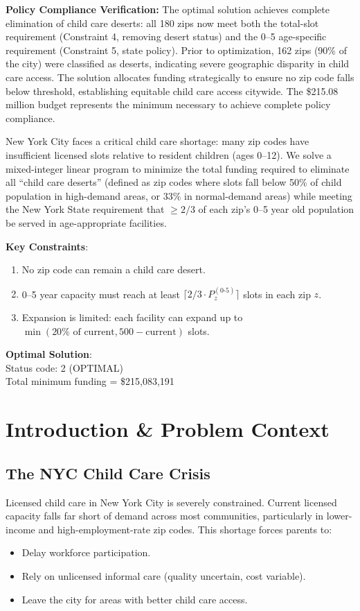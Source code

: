 \documentclass[12pt]{article}
\begin{document}
\noindent\textbf{Policy Compliance Verification:} The optimal solution achieves complete elimination of child care deserts: all 180 zips now meet both the total-slot requirement (Constraint 4, removing desert status) and the 0--5 age-specific requirement (Constraint 5, state policy). Prior to optimization, 162 zips (90\% of the city) were classified as deserts, indicating severe geographic disparity in child care access. The solution allocates funding strategically to ensure no zip code falls below threshold, establishing equitable child care access citywide. The \$215.08 million budget represents the minimum necessary to achieve complete policy compliance.

New York City faces a critical child care shortage: many zip codes have insufficient licensed slots relative to 
resident children (ages 0--12). We solve a mixed-integer linear program to minimize the total funding required to 
eliminate all ``child care deserts'' (defined as zip codes where slots fall below 50\% of child population in 
high-demand areas, or 33\% in normal-demand areas) while meeting the New York State requirement that $\geq 2/3$ 
of each zip's 0--5 year old population be served in age-appropriate facilities.

\textbf{Key Constraints}:
\begin{enumerate}
    \item No zip code can remain a child care desert.
    \item 0--5 year capacity must reach at least $\lceil 2/3 \cdot P_z^{(0\text{-}5)} \rceil$ slots in each zip $z$.
    \item Expansion is limited: each facility can expand up to $\min(20\% \text{ of current}, 500 - \text{current})$ slots.
\end{enumerate}

\textbf{Optimal Solution}: \\
Status code: 2 (OPTIMAL) \\
Total minimum funding = \$215,083,191

\section{Introduction \& Problem Context}

\subsection{The NYC Child Care Crisis}

Licensed child care in New York City is severely constrained. Current licensed capacity falls far short of 
demand across most communities, particularly in lower-income and high-employment-rate zip codes. This shortage 
forces parents to:
\begin{itemize}
    \item Delay workforce participation.
    \item Rely on unlicensed informal care (quality uncertain, cost variable).
    \item Leave the city for areas with better child care access.
\end{itemize}
\end{document}

